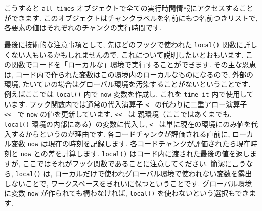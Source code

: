 \documentclass[
  11pt,
  lualatex,ja=standard,jafont=noto]{bxjsreport}
\newenvironment{Shaded}{\begin{snugshade}}{\end{snugshade}}
\newcommand{\AttributeTok}[1]{\textcolor[rgb]{0.77,0.63,0.00}{#1}}
\newcommand{\CommentTok}[1]{\textcolor[rgb]{0.56,0.35,0.01}{\textit{#1}}}
\newcommand{\ConstantTok}[1]{\textcolor[rgb]{0.00,0.00,0.00}{#1}}
\newcommand{\ControlFlowTok}[1]{\textcolor[rgb]{0.13,0.29,0.53}{\textbf{#1}}}
\newcommand{\FunctionTok}[1]{\textcolor[rgb]{0.00,0.00,0.00}{#1}}
\newcommand{\NormalTok}[1]{#1}
\newcommand{\OtherTok}[1]{\textcolor[rgb]{0.56,0.35,0.01}{#1}}
\newcommand{\SpecialCharTok}[1]{\textcolor[rgb]{0.00,0.00,0.00}{#1}}
\begin{document}
\begin{Shaded}
\end{Shaded}

こうすると \texttt{all\_times} オブジェクトで全ての実行時間情報にアクセスすることができます. このオブジェクトはチャンクラベルを名前にもつ名前つきリストで, 各要素の値はそれぞれのチャンクの実行時間です.

最後に技術的な注意事項として, 先ほどのフックで使われた \texttt{local()} 関数に詳しくない人もいるかもしれませんので, これについて説明したいとおもいます. この関数でコードを「ローカルな」環境で実行することができます. その主な恩恵は, コード内で作られた変数はこの環境内のローカルなものになるので, 外部の環境, たいていの場合はグローバル環境を汚染することがないということです. 例えばここでは \texttt{local()} 内で \texttt{now} 変数を作成し, これを \texttt{time\_it} 内で使用しています. フック関数内では通常の代入演算子 \texttt{\textless{}-} の代わりに二重アロー演算子 \texttt{\textless{}\textless{}-} で \texttt{now} の値を更新しています. \texttt{\textless{}\textless{}-} は 親環境（ここではあくまでも, \texttt{local()} 環境の内部にある）の変数に代入し, \texttt{\textless{}-} は単に現在の環境にのみ値を代入するからというのが理由です. 各コードチャンクが評価される直前に, ローカル変数 \texttt{now} は現在の時刻を記録します. 各コードチャンクが評価されたら現在時刻と \texttt{now} との差を計算します. \texttt{local()} はコード内に渡された最後の値を返しますが, ここではそれがフック関数であることに注意してください. 簡潔に言うなら, \texttt{local()} は, ローカルだけで使われグローバル環境で使われない変数を露出しないことで, ワークスペースをきれいに保つということです. グローバル環境に変数 \texttt{now} が作られても構わなければ, \texttt{local()} を使わないという選択もできます.
\end{document}
